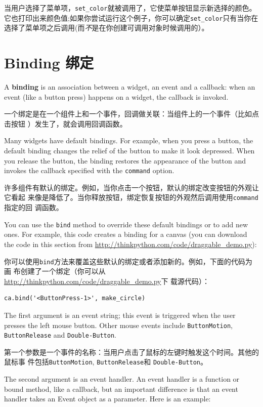 \documentclass[10pt]{book}
\begin{document}
\begin{CJK}{UTF8}{gbsn}
当用户选择了菜单项，\verb"set_color"就被调用了，它使菜单按钮显示新选择的颜色。
它也打印出来颜色值;如果你尝试运行这个例子，你可以确定\verb"set_color"只有当你在
选择了菜单项之后调用(而{\em 不}是在你创建可调用对象时候调用的）。


\section{Binding 绑定}

A {\bf binding} is an association between a widget, an event and a
callback: when an event (like a button press) happens on a widget, the
callback is invoked.

一个绑定是在一个组件上和一个事件，回调做关联：当组件上的一个事件（比如点击按钮
）发生了，就会调用回调函数。

Many widgets have default bindings.  For example, when you press
a button, the default binding changes the relief of the button
to make it look depressed.  When you release the button, the
binding restores the appearance of the button and invokes the
callback specified with the {\tt command} option.

许多组件有默认的绑定。例如，当你点击一个按钮，默认的绑定改变按钮的外观让它看起
来像是降低了。当你释放按钮，绑定恢复按钮的外观然后调用使用{\tt command}指定的回
调函数。

You can use the {\tt bind} method to override these default
bindings or to add new ones.  For example, this code creates a
binding for a canvas (you can download the code in this
section from \url{http://thinkpython.com/code/draggable_demo.py}):

你可以使用{\tt bind}方法来覆盖这些默认的绑定或者添加新的。例如，下面的代码为画
布创建了一个绑定（你可以从\url{http://thinkpython.com/code/draggable_demo.py}下
载源代码）：

\begin{verbatim}
ca.bind('<ButtonPress-1>', make_circle)
\end{verbatim}
%
The first argument is an event string; this event is triggered
when the user presses the left mouse button.  Other mouse
events include {\tt ButtonMotion}, {\tt ButtonRelease} and
{\tt Double-Button}.

第一个参数是一个事件的名称：当用户点击了鼠标的左键时触发这个时间。其他的鼠标事
件包括{\tt ButtonMotion}, {\tt ButtonRelease}和 {\tt Double-Button}。

The second argument is an event handler.  An event handler
is a function or bound method, like a callback, but an important
difference is that an event handler takes an Event object as a
parameter.  Here is an example:


\end{CJK}
\end{document}
